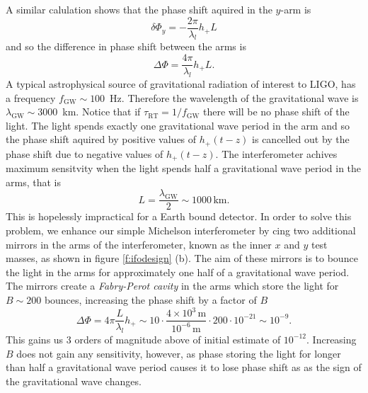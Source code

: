 A similar calulation shows that the phase shift aquired in the $y$-arm is
\begin{equation}
\delta \Phi_y = - \frac{2\pi}{\lambda_l} h_{+} L
\end{equation}
and so the difference in phase shift between the arms is
\begin{equation}
\Delta \Phi = \frac{4\pi}{\lambda_l} h_{+} L.
\end{equation}
A typical astrophysical source of gravitational radiation of interest to LIGO,
has a frequency $f_\mathrm{GW} \sim 100$~Hz. Therefore the wavelength of the
gravitational wave is $\lambda_\mathrm{GW} \sim 3000$~km. Notice that if
$\tau_\mathrm{RT} = 1 / f_\mathrm{GW}$ there will be no phase shift of the
light. The light spends exactly one gravitational wave period in the arm and
so the phase shift aquired by positive values of $h_+(t-z)$ is cancelled out
by the phase shift due to negative values of $h_+(t-z)$. The interferometer
achives maximum sensitvity when the light spends half a gravitational wave
period in the arms, that is
\begin{equation}
L = \frac{\lambda_\mathrm{GW}}{2} \sim 1000\,\mathrm{km}.
\end{equation}
This is hopelessly impractical for a Earth bound detector. In order to solve
this problem, we enhance our simple Michelson interferometer by cing two
additional mirrors in the arms of the interferometer, known as the inner $x$
and $y$ test masses, as shown in figure \ref{f:ifodesign} (b). The aim of
these mirrors is to bounce the light in the arms for approximately one half of
a gravitational wave period.  The mirrors create a \emph{Fabry-Perot cavity}
in the arms which store the light for $B \sim 200$ bounces, increasing the
phase shift by a factor of $B$
\begin{equation}
\Delta \Phi = 4\pi \frac{L}{\lambda_l} h_{+} \sim 
10 \cdot \frac{4 \times 10^3\,\mathrm{m}}{10^{-6}\,\mathrm{m}} \cdot 200 \cdot
10^{-21} \sim 10^{-9}.
\end{equation}
This gains us 3 orders of magnitude above of initial estimate of $10^{-12}$.
Increasing $B$ does not gain any sensitivity, however, as phase storing the
light for longer than half a gravitational wave period causes it to lose phase
shift as as the sign of the gravitational wave changes.

